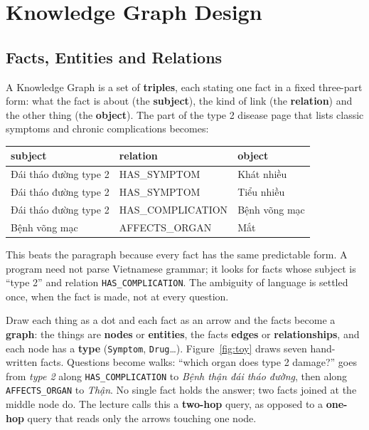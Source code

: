 \documentclass[11pt, a4paper]{article}
\newcommand{\code}[1]{\texttt{#1}}
\begin{document}
\section{Knowledge Graph Design}
\label{sec:kg}

\subsection{Facts, Entities and Relations}

A Knowledge Graph is a set of \textbf{triples}, each stating one fact in a fixed three-part form: what the fact is about (the \textbf{subject}), the kind of link (the \textbf{relation}) and the other thing (the \textbf{object}). The part of the type 2 disease page that lists classic symptoms and chronic complications becomes:

\begin{center}
\small
\begin{tabular}{lll}
\toprule
subject & relation & object \\
\midrule
Đái tháo đường type 2 & HAS\_SYMPTOM & Khát nhiều \\
Đái tháo đường type 2 & HAS\_SYMPTOM & Tiểu nhiều \\
Đái tháo đường type 2 & HAS\_COMPLICATION & Bệnh võng mạc \\
Bệnh võng mạc & AFFECTS\_ORGAN & Mắt \\
\bottomrule
\end{tabular}
\end{center}

This beats the paragraph because every fact has the same predictable form. A program need not parse Vietnamese grammar; it looks for facts whose subject is ``type 2'' and relation \code{HAS\_COMPLICATION}. The ambiguity of language is settled once, when the fact is made, not at every question.

Draw each thing as a dot and each fact as an arrow and the facts become a \textbf{graph}: the things are \textbf{nodes} or \textbf{entities}, the facts \textbf{edges} or \textbf{relationships}, and each node has a \textbf{type} (\code{Symptom}, \code{Drug}\ldots). Figure~\ref{fig:toy} draws seven hand-written facts. Questions become walks: ``which organ does type 2 damage?'' goes from \emph{type 2} along \code{HAS\_COMPLICATION} to \emph{Bệnh thận đái tháo đường}, then along \code{AFFECTS\_ORGAN} to \emph{Thận}. No single fact holds the answer; two facts joined at the middle node do. The lecture calls this a \textbf{two-hop} query, as opposed to a \textbf{one-hop} query that reads only the arrows touching one node.
\end{document}
